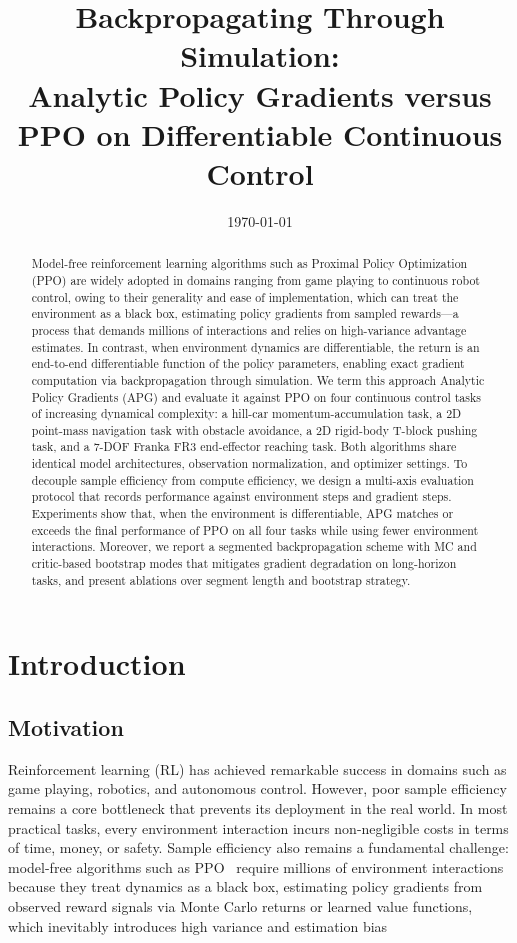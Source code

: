 \documentclass[11pt,a4paper]{article}
\title{\textbf{Backpropagating Through Simulation: \\ Analytic Policy Gradients versus PPO on Differentiable Continuous Control}}
\author{
}
\date{\today}
\begin{document}
\maketitle

\begin{abstract}
Model-free reinforcement learning algorithms such as Proximal Policy Optimization (PPO) are widely adopted in domains ranging from game playing to continuous robot control, owing to their generality and ease of implementation, which can treat the environment as a black box, estimating policy gradients from sampled rewards—a process that demands millions of interactions and relies on high-variance advantage estimates. In contrast, when environment dynamics are differentiable, the return is an end-to-end differentiable function of the policy parameters, enabling exact gradient computation via backpropagation through simulation. We term this approach Analytic Policy Gradients (APG) and evaluate it against PPO on four continuous control tasks of increasing dynamical complexity: a hill-car momentum-accumulation task, a 2D point-mass navigation task with obstacle avoidance, a 2D rigid-body T-block pushing task, and a 7-DOF Franka FR3 end-effector reaching task. Both algorithms share identical model architectures, observation normalization, and optimizer settings. To decouple sample efficiency from compute efficiency, we design a multi-axis evaluation protocol that records performance against environment steps and gradient steps. Experiments show that, when the environment is differentiable, APG matches or exceeds the final performance of PPO on all four tasks while using fewer environment interactions. Moreover, we report a segmented backpropagation scheme with MC and critic-based bootstrap modes that mitigates gradient degradation on long-horizon tasks, and present ablations over segment length and bootstrap strategy.
\end{abstract}

\section{Introduction}
\label{sec:introduction}

\subsection{Motivation}
\label{sec:motivation}
Reinforcement learning (RL) has achieved remarkable success in domains such as  game playing, robotics, and autonomous control. However, poor sample efficiency remains a core bottleneck that prevents its deployment in the real world. In most practical tasks, every environment interaction incurs non-negligible costs in terms of time, money, or safety. Sample efficiency also remains a fundamental challenge: model-free algorithms such as PPO~\cite{schulman2017ppo} require millions of environment interactions because they treat dynamics as a black box, estimating policy gradients from observed reward signals via Monte Carlo returns or learned value functions, which inevitably introduces high variance and estimation bias
\end{document}
